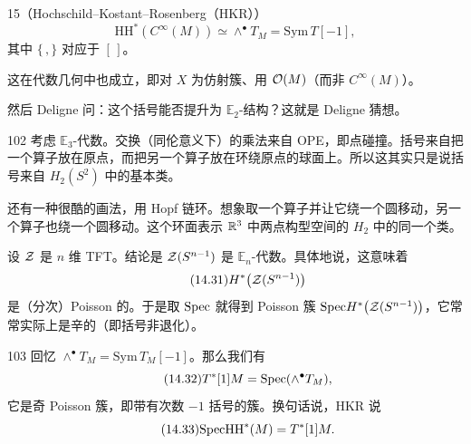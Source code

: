 \begin{srcthm}{15（Hochschild–Kostant–Rosenberg（HKR））}
\begin{equation}\tag{14.30}
\mathrm{HH}^*(C^\infty(M))\simeq\wedge^\bullet T_M=\mathrm{Sym}\,T[-1],
\end{equation}
其中 $\{\,,\}$ 对应于 $[\,]$。
\end{srcthm}

这在代数几何中也成立，即对 $X$ 为仿射簇、用 $\mathcal{O}(M)$（而非 $C^\infty(M)$）。

然后 Deligne 问：这个括号能否提升为 $\mathbb{E}_2$-结构？这就是 Deligne 猜想。

\begin{srcex}{102}
考虑 $\mathbb{E}_3$-代数。交换（同伦意义下）的乘法来自 OPE，即点碰撞。括号来自把一个算子放在原点，而把另一个算子放在环绕原点的球面上。所以这其实只是说括号来自 $H_2(S^2)$ 中的基本类。
\end{srcex}
还有一种很酷的画法，用 Hopf 链环。想象取一个算子并让它绕一个圆移动，另一个算子也绕一个圆移动。这个环面表示 $\mathbb{R}^3$ 中两点构型空间的 $H_2$ 中的同一个类。

设 $\mathcal{Z}$ 是 $n$ 维 TFT。结论是 $\mathcal{Z}(S^{n-1})$ 是 $\mathbb{E}_n$-代数。具体地说，这意味着
\begin{equation}\tag{14.31}
H^*\bigl(\mathcal{Z}(S^{n-1})\bigr)
\end{equation}
是（分次）Poisson 的。于是取 $\mathrm{Spec}$ 就得到 Poisson 簇 $\mathrm{Spec} H^*\bigl(\mathcal{Z}(S^{n-1})\bigr)$，它常常实际上是辛的（即括号非退化）。

\begin{srcex}{103}
回忆 $\wedge^\bullet T_M=\mathrm{Sym}\,T_M[-1]$。那么我们有
\begin{equation}\tag{14.32}
T^*[1]M=\mathrm{Spec}(\wedge^\bullet T_M),
\end{equation}
它是奇 Poisson 簇，即带有次数 $-1$ 括号的簇。换句话说，HKR 说
\begin{equation}\tag{14.33}
\mathrm{Spec}\mathrm{HH}^*(M)=T^*[1]M.
\end{equation}
\end{srcex}

